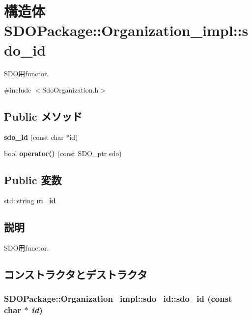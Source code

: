 \section{構造体 SDOPackage::Organization\_\-impl::sdo\_\-id}
\label{structSDOPackage_1_1Organization__impl_1_1sdo__id}


SDO用functor.  




{\ttfamily \#include $<$SdoOrganization.h$>$}

\subsection*{Public メソッド}
\begin{DoxyCompactItemize}
\item 
{\bf sdo\_\-id} (const char $\ast$id)
\item 
bool {\bf operator()} (const SDO\_\-ptr sdo)
\end{DoxyCompactItemize}
\subsection*{Public 変数}
\begin{DoxyCompactItemize}
\item 
std::string {\bf m\_\-id}
\end{DoxyCompactItemize}


\subsection{説明}
SDO用functor. 

\subsection{コンストラクタとデストラクタ}
\subsubsection[{sdo\_\-id}]{\setlength{\rightskip}{0pt plus 5cm}SDOPackage::Organization\_\-impl::sdo\_\-id::sdo\_\-id (const char $\ast$ {\em id})\hspace{0.3cm}{\ttfamily  [inline]}}\label{structSDOPackage_1_1Organization__impl_1_1sdo__id_af286caf8a2b357056d013437c56c1ca1}


